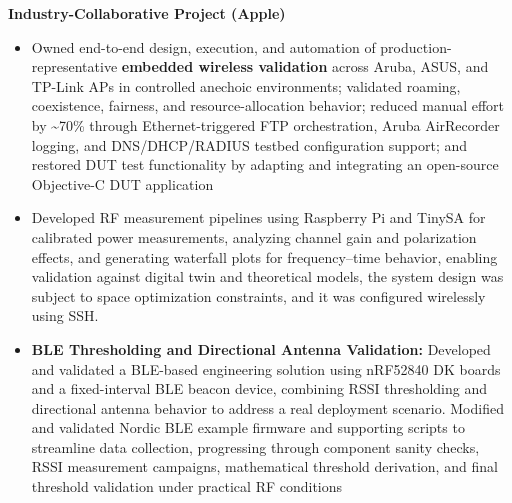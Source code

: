 \documentclass[letterpaper,11pt]{article}
\begin{document}
\item \textbf{Industry-Collaborative Project (Apple)}
\begin{itemize}[leftmargin=1.5em]
 \item Owned end-to-end design, execution, and automation of production-representative \textbf{embedded wireless validation} across Aruba, ASUS, and TP-Link APs in controlled anechoic environments; validated roaming, coexistence, fairness, and resource-allocation behavior; reduced manual effort by \textasciitilde70\% through Ethernet-triggered FTP orchestration, Aruba AirRecorder logging, and DNS/DHCP/RADIUS testbed configuration support; and restored DUT test functionality by adapting and integrating an open-source Objective-C DUT application
   
    \item Developed RF measurement pipelines using Raspberry Pi and TinySA for calibrated power measurements, analyzing channel gain and polarization effects, and generating waterfall plots for frequency–time behavior, enabling validation against digital twin and theoretical models, the system design was subject to space optimization constraints, and it was configured wirelessly using SSH.
 

    \item \textbf{BLE Thresholding and Directional Antenna Validation:} Developed and validated a BLE-based engineering solution using nRF52840 DK boards and a fixed-interval BLE beacon device, combining RSSI thresholding and directional antenna behavior to address a real deployment scenario. Modified and validated Nordic BLE example firmware and supporting scripts to streamline data collection, progressing through component sanity checks, RSSI measurement campaigns, mathematical threshold derivation, and final threshold validation under practical RF conditions
\end{itemize}
\end{document}
